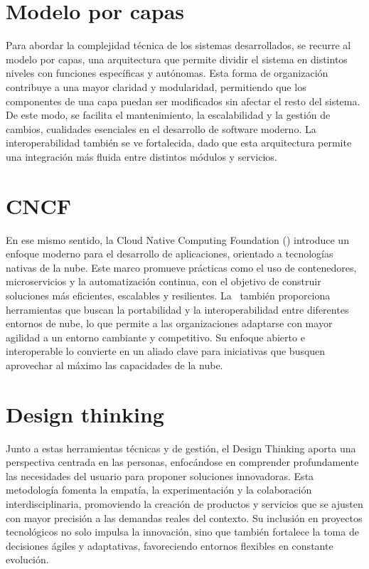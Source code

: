 \section{Modelo por capas}
Para abordar la complejidad técnica de los sistemas desarrollados, se recurre al modelo por capas, una arquitectura que permite dividir el sistema en distintos niveles con funciones específicas y autónomas. Esta forma de organización contribuye a una mayor claridad y modularidad, permitiendo que los componentes de una capa puedan ser modificados sin afectar el resto del sistema\citep{Spray2023}. De este modo, se facilita el mantenimiento, la escalabilidad y la gestión de cambios, cualidades esenciales en el desarrollo de software moderno. La interoperabilidad también se ve fortalecida, dado que esta arquitectura permite una integración más fluida entre distintos módulos y servicios.

\section{CNCF}
En ese mismo sentido, la Cloud Native Computing Foundation (\CNCF) introduce un enfoque moderno para el desarrollo de aplicaciones, orientado a tecnologías nativas de la nube. Este marco promueve prácticas como el uso de contenedores, microservicios y la automatización continua, con el objetivo de construir soluciones más eficientes, escalables y resilientes\citep{CNCF2023}. La \CNCF\ también proporciona herramientas que buscan la portabilidad y la interoperabilidad entre diferentes entornos de nube, lo que permite a las organizaciones adaptarse con mayor agilidad a un entorno cambiante y competitivo. Su enfoque abierto e interoperable lo convierte en un aliado clave para iniciativas que busquen aprovechar al máximo las capacidades de la nube.

\section{Design thinking}
Junto a estas herramientas técnicas y de gestión, el Design Thinking aporta una perspectiva centrada en las personas, enfocándose en comprender profundamente las necesidades del usuario para proponer soluciones innovadoras\citep{CombellesC.LucenaP.2020}. Esta metodología fomenta la empatía, la experimentación y la colaboración interdisciplinaria, promoviendo la creación de productos y servicios que se ajusten con mayor precisión a las demandas reales del contexto. Su inclusión en proyectos tecnológicos no solo impulsa la innovación, sino que también fortalece la toma de decisiones ágiles y adaptativas, favoreciendo entornos flexibles en constante evolución.


